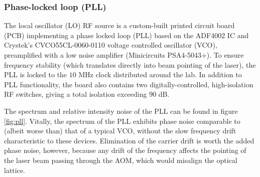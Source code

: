\documentclass[twocolumn,aps,pra,showpacs,preprintnumbers,bibnotes]{revtex4-1}
\begin{document}
\subsubsection{Phase-locked loop (PLL)}
The local oscillator (LO) RF source is a custom-built printed circuit board (PCB) implementing a phase locked loop (PLL) based on the ADF4002 IC and Crystek's CVCO55CL-0060-0110 voltage controlled oscillator (VCO), preamplified with a low noise amplifier (Minicircuits PSA4-5043+). 
To ensure frequency stability (which translates directly into beam pointing of the laser), the PLL is locked to the $10$ MHz clock distributed around the lab.
In addition to PLL functionality, the board also contains two digitally-controlled, high-isolation RF switches, giving a total isolation exceeding $90$ dB.

The spectrum and relative intensity noise of the PLL can be found in figure \ref{fig:pll}. 
Vitally, the spectrum of the PLL exhibits phase noise comparable to (albeit worse than) that of a typical VCO, without the slow frequency drift characteristic to these devices. 
Elimination of the carrier drift is worth the added phase noise, however, because any drift of the frequency affects the pointing of the laser beam passing through the AOM, which would misalign the optical lattice.
\end{document}
